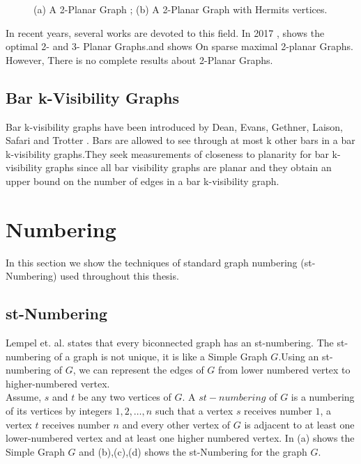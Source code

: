 \begin{figure}[!tb]
  \centering
\resizebox{150mm}{!}{}
\caption{(a) A 2-Planar Graph ; (b) A 2-Planar Graph with Hermits vertices.}
\label{fig:2p}
\end{figure}


In recent years, several works are devoted to this field. In 2017 , \cite{michael} shows the optimal 2- and 3- Planar Graphs.and \cite{Christopher} shows On sparse maximal 2-planar Graphs. However, There is no complete results about 2-Planar Graphs.



\subsection{Bar k-Visibility Graphs}

Bar k-visibility graphs have been introduced by Dean, Evans, Gethner, Laison, Safari and Trotter \cite{M}. Bars are allowed to see through at most k other bars in a bar k-visibility graphs.They seek measurements of closeness to planarity for bar k-visibility graphs since all bar visibility graphs are planar and they obtain an upper bound on the number of edges in a bar k-visibility graph.



\section{Numbering}
\label{number}

In this section we show the techniques of standard graph numbering (st-Numbering) used
throughout this thesis.


\subsection{st-Numbering}

Lempel et. al. \cite{Even} states that every biconnected graph has an st-numbering. The st-numbering of a graph is not unique, it is like a Simple Graph $G$.Using an st-numbering of $G$, we can represent the edges of $G$ from lower numbered vertex to higher-numbered vertex.
\\
Assume, $s$ and $t$ be any two vertices of $G$. A $st-numbering$ of
$G$ is a numbering of its vertices by integers $1, 2, \ldots , n$ such that a vertex $s$
receives number $1$, a vertex $t$ receives number $n$ and every other vertex of
$G$ is adjacent to at least one lower-numbered vertex and at least one higher numbered vertex.
In  (a) shows the Simple Graph $G$ and (b),(c),(d) shows the st-Numbering for the graph $G$.



